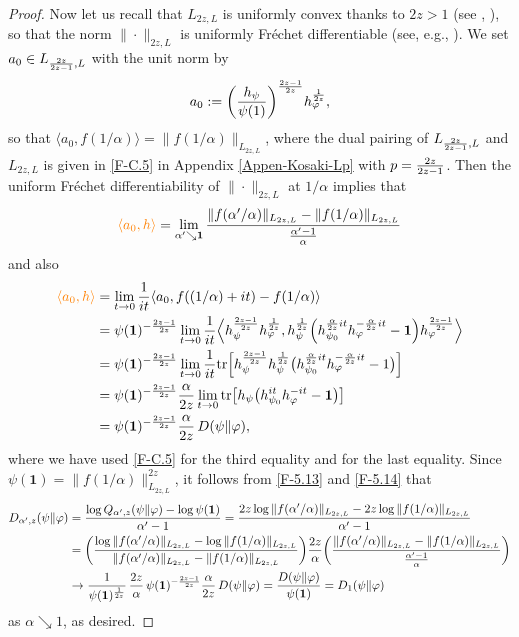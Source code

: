 \documentclass[12pt]{article}
\theoremstyle{definition}
\theoremstyle{remark}
\numberwithin{equation}{section}
\def\Tr{\mathrm{tr}}
\def\<{\langle}
\def\>{\rangle}
\def\ffi{\varphi}
\def\1{\mathbf{1}}
\begin{document}
\begin{proof}
Now let us recall that $L_{2z,L}$ is uniformly convex thanks to $2z>1$ (see \cite{haagerup1979lpspaces},
\cite[Theorem 4.2]{kosaki1984applications}), so that the norm $\|\cdot\|_{2z,L}$ is uniformly Fr\'echet
differentiable (see, e.g., \cite[Part 3, Chap.~II]{beauzamy1982introduction}). {\color{red}We set
$a_0\in L_{{2z\over2z-1},L}$ with the unit norm by
\[
a_0:=\biggl({h_\psi\over\psi(1)}\biggr)^{2z-1\over2z}h_\ffi^{1\over2z},
\]
so that $\<a_0,f(1/\alpha)\>=\|f(1/\alpha)\|_{L_{2z,L}}$, where the dual pairing of $L_{{2z\over2z-1},L}$
and $L_{2z,L}$ is given in \eqref{F-C.5} in Appendix \ref{Appen-Kosaki-Lp} with $p={2z\over2z-1}$.} Then
the uniform Fr\'echet differentiability of $\|\cdot\|_{2z,L}$ at $1/\alpha$ implies that
\begin{align}\label{F-5.13}
\textcolor{orange}{\<a_0,h\>}
=\lim_{\alpha'\searrow\1}{\|f(\alpha'/\alpha)\|_{L_{2z,L}}-\|f(1/\alpha)\|_{L_{2z,L}}
\over{\alpha'-1\over\alpha}}
\end{align}
and also
\begin{align}
\textcolor{orange}{\<a_0,h\>}
&=\lim_{t\to0}{1\over it}\<a_0,f((1/\alpha)+it)-f(1/\alpha)\> \nonumber\\
&=\psi(\1)^{-{2z-1\over2z}}\lim_{t\to0}{1\over it}\Bigl\<h_\psi^{2z-1\over2z}h_\ffi^{1\over2z},
h_\psi^{1\over2z}\Bigl(h_{\psi_0}^{{\alpha\over2z}it}h_\ffi^{-{\alpha\over2z}it}-\1\Bigr)
h_\ffi^{2z-1\over2z}\Bigr\> \nonumber\\
&=\psi(\1)^{-{2z-1\over2z}}\lim_{t\to0}{1\over it}\Tr\Bigl[h_\psi^{2z-1\over2z}h_\psi^{1\over2z}
\bigl(h_{\psi_0}^{{\alpha\over2z}it}h_\ffi^{-{\alpha\over2z}it}-1\bigr)\Bigr] \nonumber\\
&=\psi(\1)^{-{2z-1\over2z}}{\alpha\over2z}
\lim_{t\to0}\Tr\bigl[h_\psi\bigl(h_{\psi_0}^{it}h_\ffi^{-it}-\1\bigr)\bigr] \nonumber\\
&=\psi(\1)^{-{2z-1\over2z}}{\alpha\over2z}\,D(\psi\|\ffi), \label{F-5.14}
\end{align}
where we have used {\color{red}\eqref{F-C.5} for the third equality and} \cite[Theorem 5.7]{ohya1993quantum}
for the last equality. Since $\psi(\1)=\|f(1/\alpha)\|_{L_{2z,L}}^{2z}$, it follows from \eqref{F-5.13} and
\eqref{F-5.14} that
\begin{align*}
D_{\alpha',z}(\psi\|\ffi)
&={\log Q_{\alpha',z}(\psi\|\ffi)-\log\psi(\1)\over\alpha'-1}
={2z\log\|f(\alpha'/\alpha)\|_{L_{2z,L}}-2z\log\|f(1/\alpha)\|_{L_{2z,L}}\over\alpha'-1} \\
&=\biggl({\log\|f(\alpha'/\alpha)\|_{L_{2z,L}}-\log\|f(1/\alpha)\|_{L_{2z,L}}\over
\|f(\alpha'/\alpha)\|_{L_{2z,L}}-\|f(1/\alpha)\|_{L_{2z,L}}}\biggr)
{2z\over\alpha}\biggl({\|f(\alpha'/\alpha)\|_{L_{2z,L}}-\|f(1/\alpha)\|_{L_{2z,L}}\over
{\alpha'-1\over\alpha}}\biggr) \\
&\to{1\over\psi(\1)^{1\over2z}}\,{2z\over\alpha}\,\psi(\1)^{-{2z-1\over2z}}{\alpha\over2z}\,D(\psi\|\ffi)
={D(\psi\|\ffi)\over\psi(\1)}=D_1(\psi\|\ffi)
\end{align*}
as $\alpha\searrow1$, as desired.
\end{proof}
\end{document}
